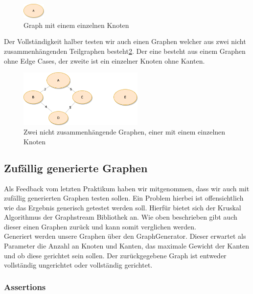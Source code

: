 \documentclass[a4paper]{article}
\begin{document}
\begin{figure}[htbp]
	\centering
		\includegraphics[width=0.1\textwidth]{Latex/Figs/Beispielgraph_3.png}		
	\caption{Graph mit einem einzelnen Knoten}
	\label{fig:beispielgraph_3}
\end{figure}

Der Vollständigkeit halber testen wir auch einen Graphen welcher aus zwei nicht zusammenhängenden Teilgraphen besteht\ref{fig:beispielgraph_1}. Der eine besteht aus einem Graphen ohne Edge Cases, der zweite ist ein einzelner Knoten ohne Kanten. 

\begin{figure}[htbp]
	\centering
		\includegraphics[width=0.55\textwidth]{Latex/Figs/Beispielgraph_1.png}		
	\caption{Zwei nicht zusammenhängende Graphen, einer mit einem einzelnen Knoten}
	\label{fig:beispielgraph_1}
\end{figure}

\subsection{Zufällig generierte Graphen}

Als Feedback vom letzten Praktikum haben wir mitgenommen, dass wir auch mit zufällig generierten Graphen testen sollen. Ein Problem hierbei ist offensichtlich wie das Ergebnis generisch getestet werden soll. Hierfür bietet sich der Kruskal Algorithmus der Graphstream Bibliothek an. Wie oben beschrieben gibt auch dieser einen Graphen zurück und kann somit verglichen werden.\\
Generiert werden unsere Graphen über den GraphGenerator. Dieser erwartet als Parameter die Anzahl an Knoten und Kanten, das maximale Gewicht der Kanten und ob diese gerichtet sein sollen. Der zurückgegebene Graph ist entweder vollständig ungerichtet oder vollständig gerichtet.

\subsubsection{Assertions}
\end{document}
